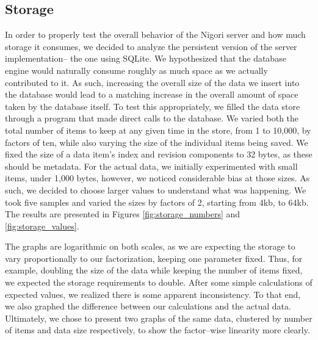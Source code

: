 \subsection{Storage}
In order to properly test the overall behavior of the Nigori server and how much storage it consumes, we decided to analyze the persistent version of the server implementation-- the one using SQLite.
We hypothesized that the database engine would naturally consume roughly as much space as we actually contributed to it.
As such, increasing the overall size of the data we insert into the database would lead to a matching increase in the overall amount of space taken by the database itself.
To test this appropriately, we filled the data store through a program that made direct calls to the database.
We varied both the total number of items to keep at any given time in the store, from 1 to 10,000, by factors of ten, while also varying the size of the individual items being saved.
We fixed the size of a data item's index and revision components to 32 bytes, as these should be metadata.
For the actual data, we initially experimented with small items, under 1,000 bytes, however, we noticed considerable bias at those sizes.
As such, we decided to choose larger values to understand what was happening.
We took five samples and varied the sizes by factors of 2, starting from 4kb, to 64kb.
The results are presented in Figures \ref{fig:storage_numbers} and \ref{fig:storage_values}.



The graphs are logarithmic on both scales, as we are expecting the storage to vary proportionally to our factorization, keeping one parameter fixed.
Thus, for example, doubling the size of the data while keeping the number of items fixed, we expected the storage requirements to double.
After some simple calculations of expected values, we realized there is some apparent inconsistency.
To that end, we also graphed the difference between our calculations and the actual data.
Ultimately, we chose to present two graphs of the same data, clustered by number of items and data size respectively, to show the factor--wise linearity more clearly.

